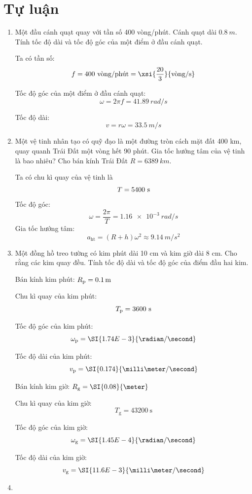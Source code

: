 \section{Tự luận}
\begin{enumerate}[label=\bfseries Câu \arabic*:, leftmargin=1.5cm]
	
	\item {}
	
	
	{
		Một đầu cánh quạt quay với tần số 400 vòng/phút. Cánh quạt dài $\SI{0.8}{m}$. Tính tốc độ dài và tốc độ góc của một điểm ở đầu cánh quạt.
	}
	
	\hideall
	{	
		Ta có tần số:
		$$f=400\ \text{vòng/phút} = \xsi{\dfrac{20}{3}}{\text{vòng/s}}$$
		
		Tốc độ góc của một điểm ở đầu cánh quạt:
		$$\omega = 2\pi f = \SI{41.89}{rad/s}$$
		
		Tốc độ dài:
		$$v=r \omega = \SI{33.5}{m/s}$$
	}
	\item {}
	
	
	{
		Một vệ tinh nhân tạo có quỹ đạo là một đường tròn cách mặt đất 400 km, quay quanh Trái Đất một vòng hết 90 phút. Gia tốc hướng tâm của vệ tinh là bao nhiêu? Cho bán kính Trái Đất $R=\SI{6389}{km}$.
	}
	
	\hideall
	{	
		Ta có chu kì quay của vệ tinh là
		$$T=5400\ \text s$$
		Tốc độ góc:
		$$\omega = \dfrac{2\pi}{T} = \SI{1.16e-3}{rad/s}$$
		Gia tốc hướng tâm:
		$$a_\text{ht} =\left(R+h\right)\omega^2 \approx \SI{9.14}{m/s^2}$$
	}
	\item {}
	
	
	{
		Một đồng hồ treo tường có kim phút dài 10 cm và kim giờ dài 8 cm. Cho rằng các kim quay đều. Tính tốc độ dài và tốc độ góc của điểm đầu hai kim.
	}
	
	\hideall
	{	
		Bán kính kim phút: $R_\text p = \SI{0.1}{m}$
		
		Chu kì quay của kim phút: $$T_\text p = 3600\ \text s$$
		
		Tốc độ góc của kim phút:
		$$\omega_\text p = \SI{1.74E-3}{\radian/\second}$$
		
		Tốc độ dài của kim phút:
		$$v_\text p = \SI{0.174}{\milli\meter/\second}$$
		
		Bán kính kim giờ: $R_\text g = \SI{0.08}{\meter}$
		
		Chu kì quay của kim giờ: $$T_\text{g} = \SI{43200}{\second}$$
		
		Tốc độ góc của kim giờ:
		$$\omega_\text g = \SI{1.45E-4}{\radian/\second}$$
		
		Tốc độ dài của kim giờ:
		$$v_\text g = \SI{11.6E-3}{\milli\meter/\second}$$	
	}
	\item {}
	

\end{enumerate}

